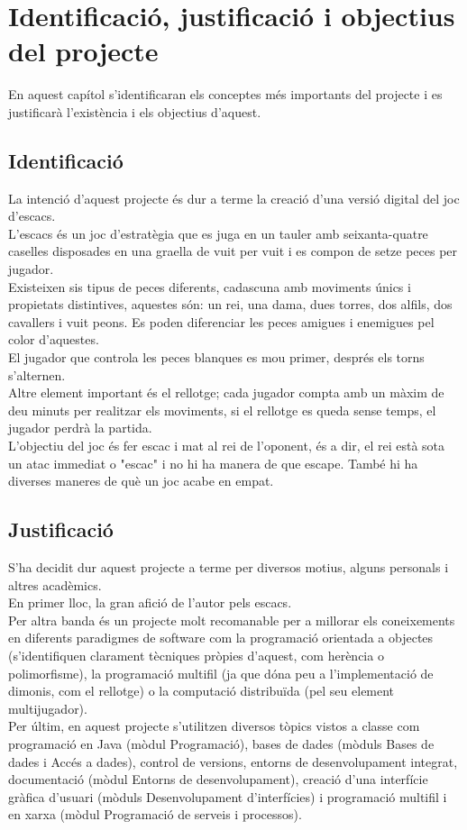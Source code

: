 \chapter{Identificació, justificació i objectius del projecte}
En aquest capítol s'identificaran els conceptes més importants del projecte i es justificarà l'existència i els objectius d'aquest.
\section{Identificació}
La intenció d'aquest projecte és dur a terme la creació d'una versió digital del joc d'escacs.
\\[3mm]
L’escacs és un joc d'estratègia que es juga en un tauler amb seixanta-quatre caselles disposades en una graella de vuit per vuit i es compon de setze peces per jugador.
\\[3mm]
Existeixen sis tipus de peces diferents, cadascuna amb moviments únics i propietats distintives, aquestes són: un rei, una dama, dues torres, dos alfils, dos cavallers i vuit peons. Es poden diferenciar les peces amigues i enemigues pel color d’aquestes.
\\[3mm]
El jugador que controla les peces blanques es mou primer, després els torns s’alternen.
\\[3mm]
Altre element important és el rellotge; cada jugador compta amb un màxim de deu minuts per realitzar els moviments, si el rellotge es queda sense temps, el jugador perdrà la partida.
\\[3mm]
L'objectiu del joc és fer escac i mat al rei de l'oponent, és a dir, el rei està sota un atac immediat o "escac" i no hi ha manera de que escape. També hi ha diverses maneres de què un joc acabe en empat.
\section{Justificació}
S’ha decidit dur aquest projecte a terme per diversos motius, alguns personals i altres acadèmics. 
\\[3mm]
En primer lloc, la gran afició de l’autor pels escacs.
\\[3mm]
Per altra banda és un projecte molt recomanable per a millorar els coneixements en diferents paradigmes de software com la programació orientada a objectes (s'identifiquen clarament tècniques pròpies d’aquest, com herència o polimorfisme), la programació multifil (ja que dóna peu a l’implementació de dimonis, com el rellotge) o la computació distribuïda (pel seu element multijugador).
\\[3mm]
Per últim, en aquest projecte s’utilitzen diversos tòpics vistos a classe com programació en Java (mòdul Programació), bases de dades (mòduls Bases de dades i Accés a dades), control de versions, entorns de desenvolupament integrat,  documentació (mòdul Entorns de desenvolupament), creació d’una interfície gràfica d'usuari (mòduls Desenvolupament d'interfícies) i programació multifil i en xarxa (mòdul Programació de serveis i processos).
